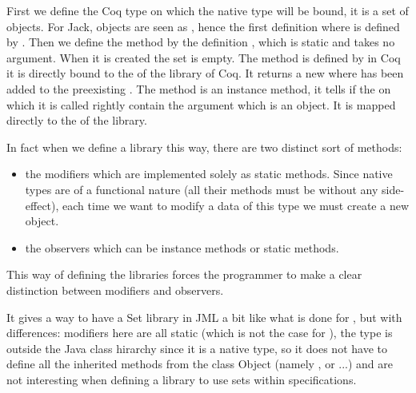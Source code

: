 First we define the Coq type on which the  native type will be bound,
it is a set of objects. For Jack, objects are seen as , hence the first definition
where  is defined by .
Then we define the method  by the definition , 
which is static and takes no argument. When it is created the set is empty.
The  method is defined by  in Coq it is directly bound to the 
 of the library  of Coq. It returns a new  where 
 has been added to
the preexisting  .
The  method is an instance method, it tells if the  
on which it is called rightly
contain the argument  which is an object. It is mapped directly to the 
 of the  library.


In fact when we define a library this way, there are two distinct sort of methods:
\begin{itemize}
\item the modifiers which are implemented solely as static methods. 
Since native types are of a functional nature (all their methods must be without any side-effect), 
each time we want to modify a data of this type we must create a new object.
\item the observers which can be instance methods or static methods.
\end{itemize}
This way of defining the libraries forces the programmer to make a clear distinction 
between modifiers and observers.

   
 It gives a way to have a Set library in JML a bit like what is done for 
\cite{LPCCR-03-JML}, but with differences: modifiers here are all static
(which is not the case for  ),
 the  type is outside the Java class hirarchy since it is a native type,
so it does not have 
to define all the inherited methods from the class Object 
(namely ,  or 
...) and are not interesting when defining a library to use sets within specifications.